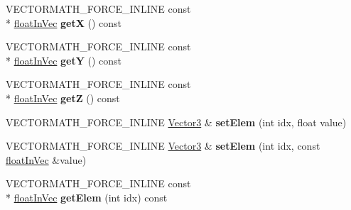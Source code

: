 \begin{DoxyCompactItemize}
\item 
\hypertarget{class_vectormath_1_1_aos_1_1_vector3_af300754511c00745dbec4eebc09f5e20}{V\+E\+C\+T\+O\+R\+M\+A\+T\+H\+\_\+\+F\+O\+R\+C\+E\+\_\+\+I\+N\+L\+I\+N\+E const \\*
\hyperlink{class_vectormath_1_1float_in_vec}{float\+In\+Vec} {\bfseries get\+X} () const }\label{class_vectormath_1_1_aos_1_1_vector3_af300754511c00745dbec4eebc09f5e20}

\item 
\hypertarget{class_vectormath_1_1_aos_1_1_vector3_a83d749e0ed39d14bbda29667e108466b}{V\+E\+C\+T\+O\+R\+M\+A\+T\+H\+\_\+\+F\+O\+R\+C\+E\+\_\+\+I\+N\+L\+I\+N\+E const \\*
\hyperlink{class_vectormath_1_1float_in_vec}{float\+In\+Vec} {\bfseries get\+Y} () const }\label{class_vectormath_1_1_aos_1_1_vector3_a83d749e0ed39d14bbda29667e108466b}

\item 
\hypertarget{class_vectormath_1_1_aos_1_1_vector3_a2843f7840afd091dfbf48c70afc9d670}{V\+E\+C\+T\+O\+R\+M\+A\+T\+H\+\_\+\+F\+O\+R\+C\+E\+\_\+\+I\+N\+L\+I\+N\+E const \\*
\hyperlink{class_vectormath_1_1float_in_vec}{float\+In\+Vec} {\bfseries get\+Z} () const }\label{class_vectormath_1_1_aos_1_1_vector3_a2843f7840afd091dfbf48c70afc9d670}

\item 
\hypertarget{class_vectormath_1_1_aos_1_1_vector3_a11b90185445cff075229be855e0cb73a}{V\+E\+C\+T\+O\+R\+M\+A\+T\+H\+\_\+\+F\+O\+R\+C\+E\+\_\+\+I\+N\+L\+I\+N\+E \hyperlink{class_vectormath_1_1_aos_1_1_vector3}{Vector3} \& {\bfseries set\+Elem} (int idx, float value)}\label{class_vectormath_1_1_aos_1_1_vector3_a11b90185445cff075229be855e0cb73a}

\item 
\hypertarget{class_vectormath_1_1_aos_1_1_vector3_a817e59ab224807b2a673f3b13c8fcf69}{V\+E\+C\+T\+O\+R\+M\+A\+T\+H\+\_\+\+F\+O\+R\+C\+E\+\_\+\+I\+N\+L\+I\+N\+E \hyperlink{class_vectormath_1_1_aos_1_1_vector3}{Vector3} \& {\bfseries set\+Elem} (int idx, const \hyperlink{class_vectormath_1_1float_in_vec}{float\+In\+Vec} \&value)}\label{class_vectormath_1_1_aos_1_1_vector3_a817e59ab224807b2a673f3b13c8fcf69}

\item 
\hypertarget{class_vectormath_1_1_aos_1_1_vector3_a9348111195d781637efec4c88c3143cb}{V\+E\+C\+T\+O\+R\+M\+A\+T\+H\+\_\+\+F\+O\+R\+C\+E\+\_\+\+I\+N\+L\+I\+N\+E const \\*
\hyperlink{class_vectormath_1_1float_in_vec}{float\+In\+Vec} {\bfseries get\+Elem} (int idx) const }\label{class_vectormath_1_1_aos_1_1_vector3_a9348111195d781637efec4c88c3143cb}


\end{DoxyCompactItemize}
